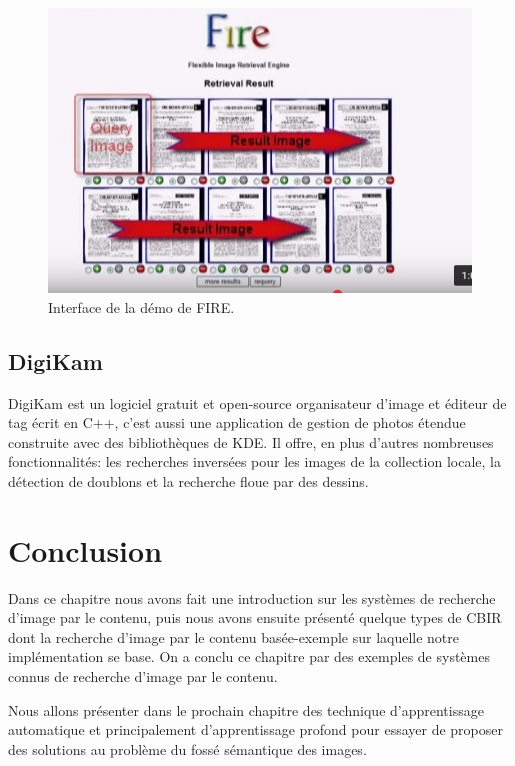 \begin{figure}[H]
	\centering
		\includegraphics[width=5in]{Figures/fire-demo.png}
	\caption[An Electron]{Interface de la démo de FIRE.}
	\label{fig:Electron}
\end{figure}

\subsection*{DigiKam}
	DigiKam est un logiciel gratuit et open-source organisateur d'image et éditeur de tag écrit en C++, c'est aussi une application de gestion de photos étendue construite avec des bibliothèques de KDE. Il offre, en plus d'autres nombreuses fonctionnalités: les recherches inversées pour les images de la collection locale, la détection de doublons et la recherche floue par des dessins.





\section{Conclusion}
	
	Dans ce chapitre nous avons fait une introduction sur les systèmes de recherche d'image par le contenu, puis nous avons ensuite présenté quelque types de CBIR dont la recherche d'image par le contenu basée-exemple 
sur laquelle notre implémentation se base. On a conclu ce chapitre par des exemples de systèmes connus de recherche d'image par le contenu.

	Nous allons présenter dans le prochain chapitre des technique d'apprentissage automatique et principalement d'apprentissage profond pour essayer de proposer des solutions au problème du fossé sémantique des images.